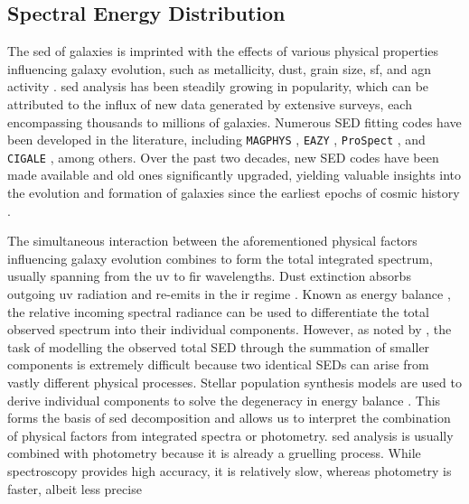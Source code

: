 \subsection{Spectral Energy Distribution}

The \gls{sed} of galaxies is imprinted with the effects of various physical properties influencing galaxy evolution, such as metallicity, dust, grain size, \gls{sf}, and \gls{agn} activity \citep{conroy_modeling_2013}. \gls{sed} analysis has been steadily growing in popularity, which can be attributed to the influx of new data generated by extensive surveys, each encompassing thousands to millions of galaxies. Numerous SED fitting codes have been developed in the literature, including \texttt{MAGPHYS} \citep{da_cunha_simple_2008}, \texttt{EAZY} \citep{brammer_eazy_2008}, \texttt{ProSpect} \citep{leja_deriving_2017, robotham_prospect_2020}, and \texttt{CIGALE} \citep{boquien_cigale_2019}, among others. Over the past two decades, new SED codes have been made available and old ones significantly upgraded, yielding valuable insights into the evolution and formation of galaxies since the earliest epochs of cosmic history \citep{walcher_fitting_2011, conroy_modeling_2013}. 

The simultaneous interaction between the aforementioned physical factors influencing galaxy evolution combines to form the total integrated spectrum, usually spanning from the \gls{uv} to \gls{fir} wavelengths. Dust extinction absorbs outgoing \gls{uv} radiation and re-emits in the \gls{ir} regime \citep{fu_decomposing_2010, wu_mid-infrared_2011, assef_mid-ir-_2011, han_evolution_2012}. Known as energy balance \citep{smith_panchromatic_2018}, the relative incoming spectral radiance can be used to differentiate the total observed spectrum into their individual components. However, as noted by \cite{boquien_cigale_2019}, the task of modelling the observed total SED through the summation of smaller components is extremely difficult because two identical SEDs can arise from vastly different physical processes. Stellar population synthesis models are used to derive individual components to solve the degeneracy in energy balance \citep{coelho_use_2020}. This forms the basis of \gls{sed} decomposition and allows us to interpret the combination of physical factors from integrated spectra or photometry. \gls{sed} analysis is usually combined with photometry because it is already a gruelling process. While spectroscopy provides high accuracy, it is relatively slow, whereas photometry is faster, albeit less precise


